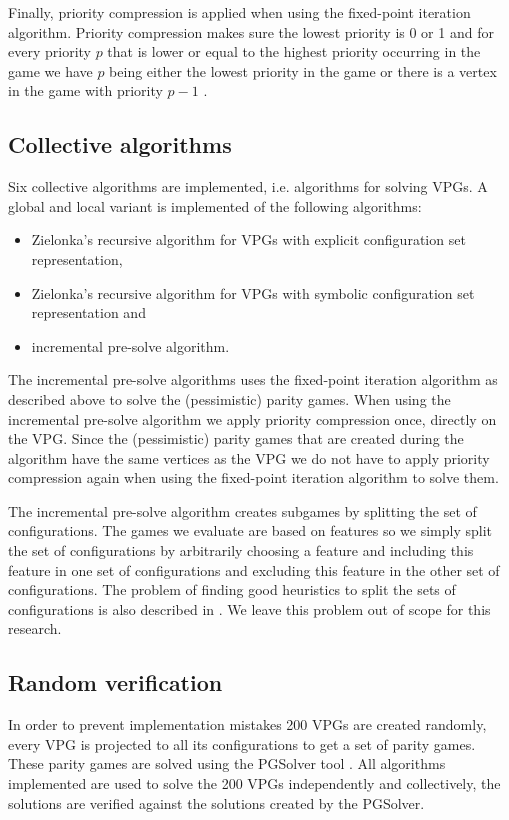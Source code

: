 Finally, priority compression is applied when using the fixed-point iteration algorithm. Priority compression makes sure the lowest priority is 0 or 1 and for every priority $p$ that is lower or equal to the highest priority occurring in the game we have $p$ being either the lowest priority in the game or there is a vertex in the game with priority $p-1$ \cite{FPITE,friedmanPG}.

\subsection{Collective algorithms}
Six collective algorithms are implemented, i.e. algorithms for solving VPGs. A global and local variant is implemented of the following algorithms:
\begin{itemize}
	\item Zielonka's recursive algorithm for VPGs with explicit configuration set representation,
	\item Zielonka's recursive algorithm for VPGs with symbolic configuration set representation and
	\item incremental pre-solve algorithm.
\end{itemize}
The incremental pre-solve algorithms uses the fixed-point iteration algorithm as described above to solve the (pessimistic) parity games. When using the incremental pre-solve algorithm we apply priority compression once, directly on the VPG. Since the (pessimistic) parity games that are created during the algorithm have the same vertices as the VPG we do not have to apply priority compression again when using the fixed-point iteration algorithm to solve them.

The incremental pre-solve algorithm creates subgames by splitting the set of configurations. The games we evaluate are based on features so we simply split the set of configurations by arbitrarily choosing a feature and including this feature in one set of configurations and excluding this feature in the other set of configurations. The problem of finding good heuristics to split the sets of configurations is also described in \cite{FamBasedModelCheckingWithMCRL2}. We leave this problem out of scope for this research.
\subsection{Random verification}
In order to prevent implementation mistakes 200 VPGs are created randomly, every VPG is projected to all its configurations to get a set of parity games. These parity games are solved using the PGSolver tool \cite{Friedmann2010ThePC}. All algorithms implemented are used to solve the 200 VPGs independently and collectively, the solutions are verified against the solutions created by the PGSolver.